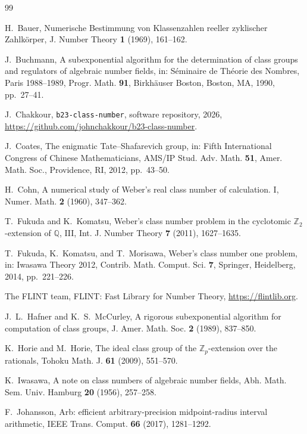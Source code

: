 \documentclass[11pt]{amsart}
\theoremstyle{plain}
\theoremstyle{definition}
\begin{document}
\begin{thebibliography}{99}

 H.~Bauer, Numerische Bestimmung von Klassenzahlen reeller zyklischer Zahlk\"orper, J. Number Theory \textbf{1} (1969), 161--162.

 J.~Buchmann, A subexponential algorithm for the determination of class groups and regulators of algebraic number fields, in: S\'eminaire de Th\'eorie des Nombres, Paris 1988--1989, Progr. Math. \textbf{91}, Birkh\"auser Boston, Boston, MA, 1990, pp.~27--41.

 J.~Chakkour, \texttt{b23-class-number}, software repository, 2026, \url{https://github.com/johnchakkour/b23-class-number}.

 J.~Coates, The enigmatic Tate--Shafarevich group, in: Fifth International Congress of Chinese Mathematicians, AMS/IP Stud. Adv. Math. \textbf{51}, Amer. Math. Soc., Providence, RI, 2012, pp.~43--50.

 H.~Cohn, A numerical study of Weber's real class number of calculation. I, Numer. Math. \textbf{2} (1960), 347--362.

 T.~Fukuda and K.~Komatsu, Weber's class number problem in the cyclotomic $\mathbb{Z}_2$-extension of $\mathbb{Q}$, III, Int. J. Number Theory \textbf{7} (2011), 1627--1635.

 T.~Fukuda, K.~Komatsu, and T.~Morisawa, Weber's class number one problem, in: Iwasawa Theory 2012, Contrib. Math. Comput. Sci. \textbf{7}, Springer, Heidelberg, 2014, pp.~221--226.

 The FLINT team, FLINT: Fast Library for Number Theory, \url{https://flintlib.org}.

 J.~L.~Hafner and K.~S.~McCurley, A rigorous subexponential algorithm for computation of class groups, J. Amer. Math. Soc. \textbf{2} (1989), 837--850.

 K.~Horie and M.~Horie, The ideal class group of the $\mathbb{Z}_p$-extension over the rationals, Tohoku Math. J. \textbf{61} (2009), 551--570.

 K.~Iwasawa, A note on class numbers of algebraic number fields, Abh. Math. Sem. Univ. Hamburg \textbf{20} (1956), 257--258.

 F.~Johansson, Arb: efficient arbitrary-precision midpoint-radius interval arithmetic, IEEE Trans. Comput. \textbf{66} (2017), 1281--1292.


\end{thebibliography}
\end{document}
